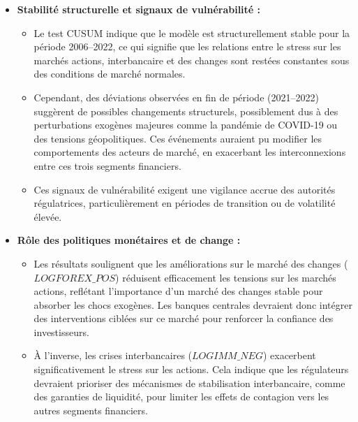 \begin{itemize}
    \item \textbf{Stabilité structurelle et signaux de vulnérabilité :}
    \begin{itemize}
        \item Le test CUSUM indique que le modèle est structurellement stable pour la période 2006–2022, ce qui signifie que les relations entre le stress sur les marchés actions, interbancaire et des changes sont restées constantes sous des conditions de marché normales.
        \item Cependant, des déviations observées en fin de période (2021–2022) suggèrent de possibles changements structurels, possiblement dus à des perturbations exogènes majeures comme la pandémie de COVID-19 ou des tensions géopolitiques. Ces événements auraient pu modifier les comportements des acteurs de marché, en exacerbant les interconnexions entre ces trois segments financiers.
        \item Ces signaux de vulnérabilité exigent une vigilance accrue des autorités régulatrices, particulièrement en périodes de transition ou de volatilité élevée.
    \end{itemize}

    \item \textbf{Rôle des politiques monétaires et de change :}
    \begin{itemize}
        \item Les résultats soulignent que les améliorations sur le marché des changes (\(LOGFOREX\_POS\)) réduisent efficacement les tensions sur les marchés actions, reflétant l’importance d’un marché des changes stable pour absorber les chocs exogènes. Les banques centrales devraient donc intégrer des interventions ciblées sur ce marché pour renforcer la confiance des investisseurs.
        \item À l’inverse, les crises interbancaires (\(LOGIMM\_NEG\)) exacerbent significativement le stress sur les actions. Cela indique que les régulateurs devraient prioriser des mécanismes de stabilisation interbancaire, comme des garanties de liquidité, pour limiter les effets de contagion vers les autres segments financiers.
    \end{itemize}


\end{itemize}
